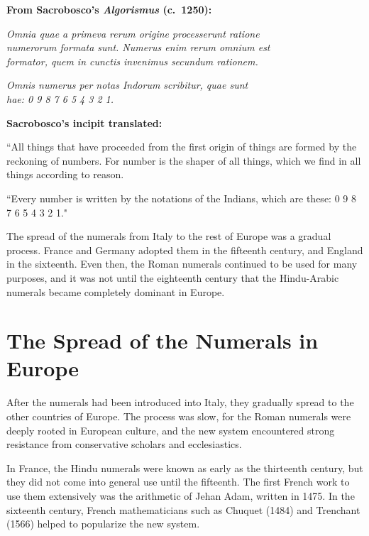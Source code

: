 \documentclass[11pt,a4paper]{article}
\newenvironment{latinpassage}{%
  \begin{tcolorbox}[colback=latinbg,colframe=rulecolor,boxrule=0.5pt,
    left=8pt,right=8pt,top=6pt,bottom=6pt,fontupper=\itshape]
}{\end{tcolorbox}}
\newenvironment{enhancednote}{%
  \begin{tcolorbox}[colback=enhancedbg,colframe=notecolor,boxrule=1pt,
    left=10pt,right=10pt,top=8pt,bottom=8pt,
    title={\textbf{Enhanced Edition Note}},fonttitle=\bfseries\color{notecolor}]
}{\end{tcolorbox}}
\begin{document}
\begin{latinpassage}
\textbf{From Sacrobosco's \textit{Algorismus} (c.~1250):}

\textit{Omnia quae a primeva rerum origine processerunt ratione}\\
\textit{numerorum formata sunt. Numerus enim rerum omnium est}\\
\textit{formator, quem in cunctis invenimus secundum rationem.}

\vspace{0.5em}
\textit{Omnis numerus per notas Indorum scribitur, quae sunt}\\
\textit{hae: 0 9 8 7 6 5 4 3 2 1.}
\end{latinpassage}

\begin{enhancednote}
\textbf{Sacrobosco's incipit translated:}

``All things that have proceeded from the first origin of things are formed by the reckoning of numbers. For number is the shaper of all things, which we find in all things according to reason.

\vspace{0.3em}
``Every number is written by the notations of the Indians, which are these: 0 9 8 7 6 5 4 3 2 1."
\end{enhancednote}

The spread of the numerals from Italy to the rest of Europe was a gradual process. France and Germany adopted them in the fifteenth century, and England in the sixteenth. Even then, the Roman numerals continued to be used for many purposes, and it was not until the eighteenth century that the Hindu-Arabic numerals became completely dominant in Europe.

\newpage

\section{The Spread of the Numerals in Europe}

After the numerals had been introduced into Italy, they gradually spread to the other countries of Europe. The process was slow, for the Roman numerals were deeply rooted in European culture, and the new system encountered strong resistance from conservative scholars and ecclesiastics.

In France, the Hindu numerals were known as early as the thirteenth century, but they did not come into general use until the fifteenth. The first French work to use them extensively was the arithmetic of Jehan Adam, written in 1475. In the sixteenth century, French mathematicians such as Chuquet (1484) and Trenchant (1566) helped to popularize the new system.
\end{document}
